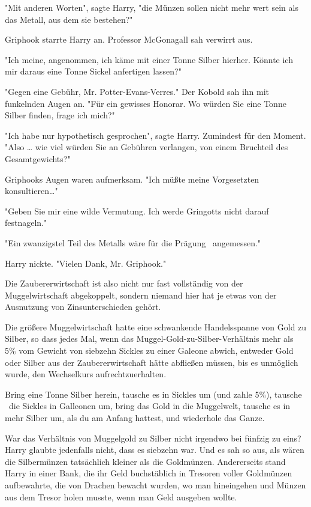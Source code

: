 {"Mit anderen Worten", sagte Harry, "die Münzen sollen nicht mehr wert sein als das Metall, aus dem sie bestehen?"

Griphook starrte Harry an. Professor McGonagall sah verwirrt aus.

"Ich meine, angenommen, ich käme mit einer Tonne Silber hierher. Könnte ich mir daraus eine Tonne Sickel anfertigen lassen?"

"Gegen eine Gebühr, Mr. Potter-Evans-Verres." Der Kobold sah ihn mit funkelnden Augen an. "Für ein gewisses Honorar. Wo würden Sie eine Tonne Silber finden, frage ich mich?"

"Ich habe nur hypothetisch gesprochen", sagte Harry. Zumindest für den Moment. "Also … wie viel würden Sie an Gebühren verlangen, von einem Bruchteil des Gesamtgewichts?"

Griphooks Augen waren aufmerksam. "Ich müßte meine Vorgesetzten konsultieren…"

"Geben Sie mir eine wilde Vermutung. Ich werde Gringotts nicht darauf festnageln."

"Ein zwanzigstel Teil des Metalls wäre für die Prägung ~angemessen."

Harry nickte. "Vielen Dank, Mr. Griphook."

Die Zaubererwirtschaft ist also nicht nur fast vollständig von der Muggelwirtschaft abgekoppelt, sondern niemand hier hat je etwas von der Ausnutzung von Zinsunterschieden gehört.

Die größere Muggelwirtschaft hatte eine schwankende Handelsspanne von Gold zu Silber, so dass jedes Mal, wenn das Muggel-Gold-zu-Silber-Verhältnis mehr als 5\% vom Gewicht von siebzehn Sickles zu einer Galeone abwich, entweder Gold oder Silber aus der Zaubererwirtschaft hätte abfließen müssen, bis es unmöglich wurde, den Wechselkurs aufrechtzuerhalten.

Bring eine Tonne Silber herein, tausche es in Sickles um (und zahle 5\%), tausche ~die Sickles in Galleonen um, bring das Gold in die Muggelwelt, tausche es in mehr Silber um, als du am Anfang hattest, und wiederhole das Ganze.

War das Verhältnis von Muggelgold zu Silber nicht irgendwo bei fünfzig zu eins? Harry glaubte jedenfalls nicht, dass es siebzehn war. Und es sah so aus, als wären die Silbermünzen tatsächlich kleiner als die Goldmünzen. Andererseits stand Harry in einer Bank, die ihr Geld buchstäblich in Tresoren voller Goldmünzen aufbewahrte, die von Drachen bewacht wurden, wo man hineingehen und Münzen aus dem Tresor holen musste, wenn man Geld ausgeben wollte.

}
